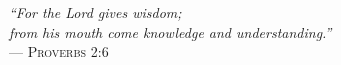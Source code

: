 \clearpage
\begin{flushright}
    \mbox{}\vfill
    {\sffamily\itshape
    ``For the Lord gives wisdom;\\
    from his mouth come knowledge and understanding.''\\}
    --- \textsc{Proverbs 2:6}
\end{flushright}
